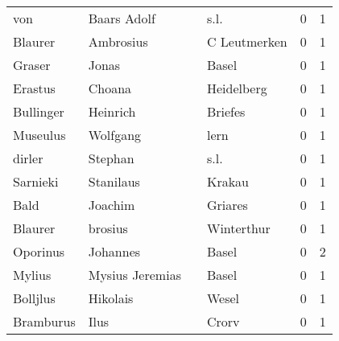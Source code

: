 \begin{tabular}{llllrr}
                      von &                        Baars Adolf &             &                                        s.l. &          0 &         1 \\
                  Blaurer &                          Ambrosius &             &                                C Leutmerken &          0 &         1 \\
                   Graser &                              Jonas &             &                                       Basel &          0 &         1 \\
                  Erastus &                             Choana &             &                                  Heidelberg &          0 &         1 \\
                Bullinger &                           Heinrich &             &                                     Briefes &          0 &         1 \\
                 Museulus &                           Wolfgang &             &                                        lern &          0 &         1 \\
                   dirler &                            Stephan &             &                                        s.l. &          0 &         1 \\
                 Sarnieki &                          Stanilaus &             &                                      Krakau &          0 &         1 \\
                     Bald &                            Joachim &             &                                     Griares &          0 &         1 \\
                  Blaurer &                            brosius &             &                                  Winterthur &          0 &         1 \\
                 Oporinus &                           Johannes &             &                                       Basel &          0 &         2 \\
                   Mylius &                    Mysius Jeremias &             &                                       Basel &          0 &         1 \\
                 Bolljlus &                           Hikolais &             &                                       Wesel &          0 &         1 \\
                Bramburus &                               Ilus &             &                                       Crorv &          0 &         1 \\

\end{tabular}
